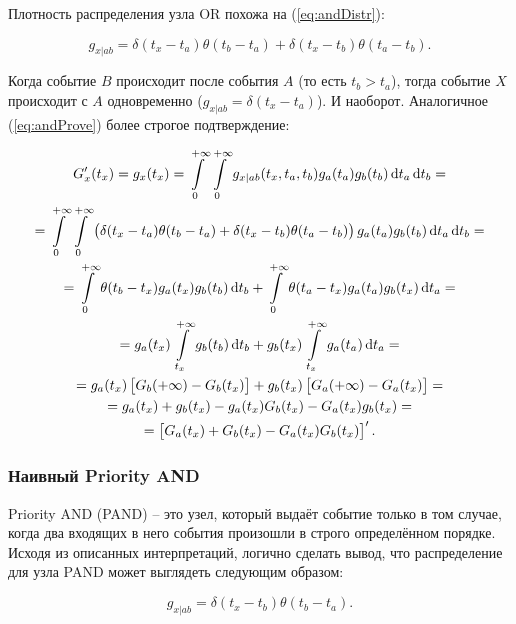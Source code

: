 \documentclass[a4paper, 12pt]{article}
\begin{document}
Плотность распределения узла OR похожа на (\ref{eq:andDistr}):

\begin{equation}
  \label{eq:orDistr}
  g_{x|ab} = \delta(t_x - t_a) \theta(t_b - t_a) + \delta(t_x - t_b) \theta(t_a - t_b).
\end{equation}

Когда событие $B$ происходит после события $A$ (то есть $t_b > t_a$), тогда событие $X$ происходит с $A$ одновременно ($g_{x|ab} = \delta(t_x - t_a)$). И наоборот. Аналогичное (\ref{eq:andProve}) более строгое подтверждение:

\begin{equation}
  \label{eq:orProve}
  \begin{gathered}
    G_x'(t_x) = g_x(t_x) = \int\limits_0^{+\infty} \int\limits_0^{+\infty}
    g_{x|ab}(t_x, t_a, t_b) g_a(t_a) g_b(t_b) \dif t_a \dif t_b = \\
    = \int\limits_0^{+\infty} \int\limits_0^{+\infty}
    \left(\delta(t_x - t_a) \theta(t_b - t_a) + \delta(t_x - t_b) \theta(t_a - t_b)\right)
    g_a(t_a) g_b(t_b) \dif t_a \dif t_b = \\
    = \int\limits_0^{+\infty} \theta(t_b - t_x) g_a(t_x) g_b(t_b) \dif t_b +
    \int\limits_0^{+\infty} \theta(t_a - t_x) g_a(t_a) g_b(t_x) \dif t_a = \\
    = g_a(t_x) \int\limits_{t_x}^{+\infty} g_b(t_b) \dif t_b +
    g_b(t_x) \int\limits_{t_x}^{+\infty} g_a(t_a) \dif t_a = \\
    = g_a(t_x) \left[G_b(+\infty) - G_b(t_x)\right] +
    g_b(t_x) \left[G_a(+\infty) - G_a(t_x)\right] = \\
    = g_a(t_x) + g_b(t_x) - g_a(t_x) G_b(t_x) - G_a(t_x) g_b(t_x) = \\
    = \left[ G_a(t_x) + G_b(t_x) - G_a(t_x) G_b(t_x) \right]'.
  \end{gathered}
\end{equation}

\subsubsection{Наивный Priority AND}

Priority AND (PAND) -- это узел, который выдаёт событие только в том случае, когда два входящих в него события произошли в строго определённом порядке. Исходя из описанных интерпретаций, логично сделать вывод, что распределение для узла PAND может выглядеть следующим образом:

\begin{equation}
  \label{eq:pandDistr1}
  g_{x|ab} = \delta(t_x - t_b) \theta(t_b - t_a).
\end{equation}
\end{document}
